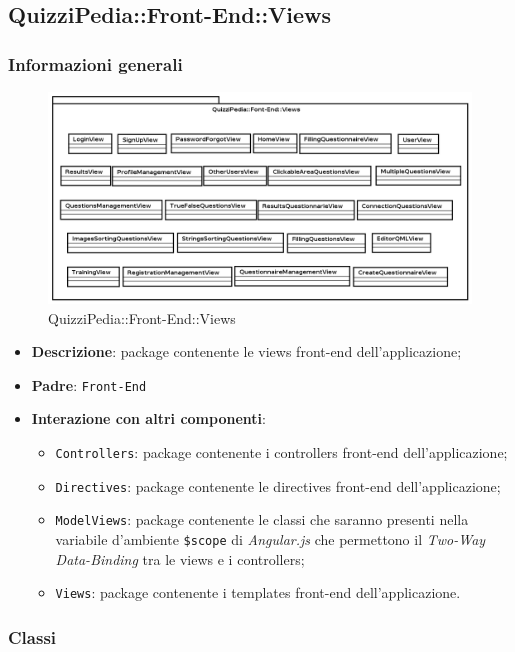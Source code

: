 \newpage

\subsection{QuizziPedia::Front-End::Views}
\subsubsection{Informazioni generali}
\label{QuizziPedia::Front-End::Views}
\begin{figure}[ht]
	\centering
	\includegraphics[scale=0.45]{UML/Package/QuizziPedia_Front-End_Views.png}
	\caption{QuizziPedia::Front-End::Views}
\end{figure}\FloatBarrier
\begin{itemize}
	\item \textbf{Descrizione}: package contenente le views front-end dell'applicazione;
	\item \textbf{Padre}: \texttt{Front-End}
	\item \textbf{Interazione con altri componenti}:
	\begin{itemize}
		\item \texttt{Controllers}: package contenente i controllers front-end dell'applicazione;
		\item \texttt{Directives}: package contenente le directives front-end dell'applicazione;
		\item \texttt{ModelViews}: package contenente le classi che saranno presenti nella variabile d'ambiente \texttt{\$scope} di \textit{Angular.js} che permettono il \textit{Two-Way Data-Binding} tra le views e i controllers;
		\item \texttt{Views}: package contenente i templates front-end dell'applicazione.
	\end{itemize}
\end{itemize}
\subsubsection{Classi}

